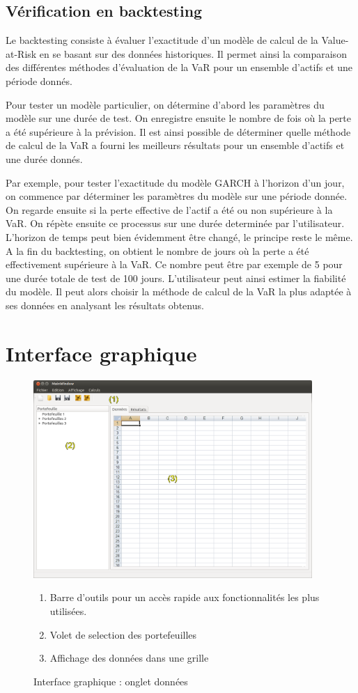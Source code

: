 	\subsection{Vérification en backtesting}
		Le backtesting consiste à évaluer l'exactitude d'un modèle de calcul de la Value-at-Risk en se basant sur des données historiques. Il permet ainsi la comparaison des différentes méthodes d'évaluation de la VaR pour un ensemble d'actifs et une période donnés.

		Pour tester un modèle particulier, on détermine d'abord les paramètres du modèle sur une durée de test. On enregistre ensuite le nombre de fois où la perte a été supérieure à la prévision. Il est ainsi possible de déterminer quelle méthode de calcul de la VaR a fourni les meilleurs résultats pour un ensemble d'actifs et une durée donnés.

		Par exemple, pour tester l'exactitude du modèle GARCH à l'horizon d'un jour, on commence par déterminer les paramètres du modèle sur une période donnée. On regarde ensuite si la perte effective de l'actif a été ou non supérieure à la VaR. On répète ensuite ce processus sur une durée determinée par l'utilisateur. L'horizon de temps peut bien évidemment être changé, le principe reste le même. A la fin du backtesting, on obtient le nombre de jours où la perte a été effectivement supérieure à la VaR. Ce nombre peut être par exemple de 5 pour une durée totale de test de 100 jours. L'utilisateur peut ainsi estimer la fiabilité du modèle. Il peut alors choisir la méthode de calcul de la VaR la plus adaptée à ses données en analysant les résultats obtenus.



\section{Interface graphique}

	\begin{figure}[h]
		\includegraphics[width=400px]{logicielDonnees.png}
		\caption{Interface graphique : onglet données}
		\label{interface}
		\begin{enumerate}
			\item Barre d'outils pour un accès rapide aux fonctionnalités les plus utilisées.
			\item Volet de selection des portefeuilles
			\item Affichage des données dans une grille 
		\end{enumerate}
	\end{figure}


